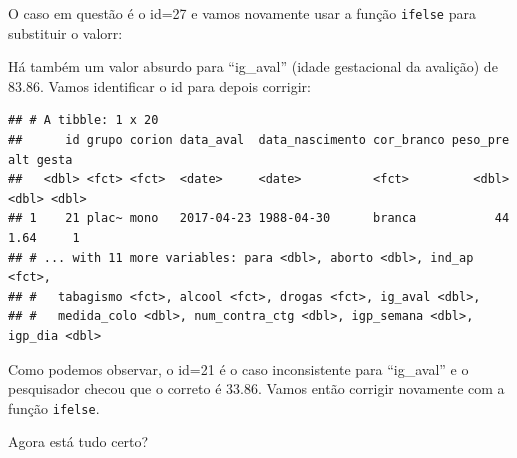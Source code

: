 \documentclass[
]{book}
\newenvironment{Shaded}{\begin{snugshade}}{\end{snugshade}}
\newcommand{\DecValTok}[1]{\textcolor[rgb]{0.00,0.00,0.81}{#1}}
\newcommand{\FloatTok}[1]{\textcolor[rgb]{0.00,0.00,0.81}{#1}}
\newcommand{\KeywordTok}[1]{\textcolor[rgb]{0.13,0.29,0.53}{\textbf{#1}}}
\newcommand{\NormalTok}[1]{#1}
\newcommand{\OperatorTok}[1]{\textcolor[rgb]{0.81,0.36,0.00}{\textbf{#1}}}
\newcommand{\StringTok}[1]{\textcolor[rgb]{0.31,0.60,0.02}{#1}}
\begin{document}
O caso em questão é o id=27 e vamos novamente usar a função \texttt{ifelse} para substituir o valorr:

\begin{Shaded}
\end{Shaded}

Há também um valor absurdo para ``ig\_aval'' (idade gestacional da avalição) de 83.86. Vamos identificar o id para depois corrigir:

\begin{Shaded}
\end{Shaded}

\begin{verbatim}
## # A tibble: 1 x 20
##      id grupo corion data_aval  data_nascimento cor_branco peso_pre   alt gesta
##   <dbl> <fct> <fct>  <date>     <date>          <fct>         <dbl> <dbl> <dbl>
## 1    21 plac~ mono   2017-04-23 1988-04-30      branca           44  1.64     1
## # ... with 11 more variables: para <dbl>, aborto <dbl>, ind_ap <fct>,
## #   tabagismo <fct>, alcool <fct>, drogas <fct>, ig_aval <dbl>,
## #   medida_colo <dbl>, num_contra_ctg <dbl>, igp_semana <dbl>, igp_dia <dbl>
\end{verbatim}

Como podemos observar, o id=21 é o caso inconsistente para ``ig\_aval'' e o pesquisador checou que o correto é 33.86. Vamos então corrigir novamente com a função \texttt{ifelse}.

\begin{Shaded}
\end{Shaded}

Agora está tudo certo?
\end{document}
